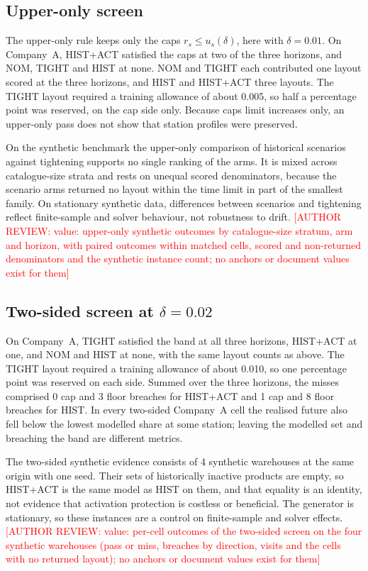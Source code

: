 \documentclass[11pt]{article}
\newcommand{\authorreview}[1]{\textcolor{red}{[AUTHOR REVIEW: #1]}}
\begin{document}
\subsection{Upper-only screen}
The upper-only rule keeps only the caps $r_s\le u_s(\delta)$, here with $\delta=0.01$. On Company~A, HIST+ACT satisfied the caps at two of the three horizons, and NOM, TIGHT and HIST at none. NOM and TIGHT each contributed one layout scored at the three horizons, and HIST and HIST+ACT three layouts. The TIGHT layout required a training allowance of about 0.005, so half a percentage point was reserved, on the cap side only. Because caps limit increases only, an upper-only pass does not show that station profiles were preserved.

On the synthetic benchmark the upper-only comparison of historical scenarios against tightening supports no single ranking of the arms. It is mixed across catalogue-size strata and rests on unequal scored denominators, because the scenario arms returned no layout within the time limit in part of the smallest family. On stationary synthetic data, differences between scenarios and tightening reflect finite-sample and solver behaviour, not robustness to drift. \authorreview{value: upper-only synthetic outcomes by catalogue-size stratum, arm and horizon, with paired outcomes within matched cells, scored and non-returned denominators and the synthetic instance count; no anchors or document values exist for them}

\subsection{Two-sided screen at $\delta=0.02$}
On Company~A, TIGHT satisfied the band at all three horizons, HIST+ACT at one, and NOM and HIST at none, with the same layout counts as above. The TIGHT layout required a training allowance of about 0.010, so one percentage point was reserved on each side. Summed over the three horizons, the misses comprised 0 cap and 3 floor breaches for HIST+ACT and 1 cap and 8 floor breaches for HIST. In every two-sided Company~A cell the realised future also fell below the lowest modelled share at some station; leaving the modelled set and breaching the band are different metrics.

The two-sided synthetic evidence consists of 4 synthetic warehouses at the same origin with one seed. Their sets of historically inactive products are empty, so HIST+ACT is the same model as HIST on them, and that equality is an identity, not evidence that activation protection is costless or beneficial. The generator is stationary, so these instances are a control on finite-sample and solver effects. \authorreview{value: per-cell outcomes of the two-sided screen on the four synthetic warehouses (pass or miss, breaches by direction, visits and the cells with no returned layout); no anchors or document values exist for them}
\end{document}
